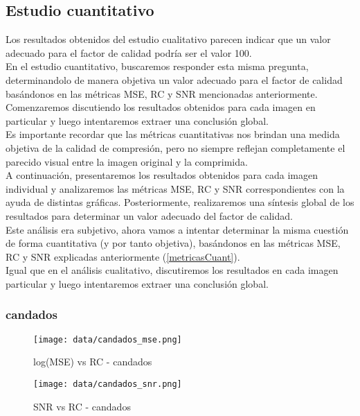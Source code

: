 \documentclass[12pt,a4paper]{article}
\begin{document}
\newpage
\subsection{Estudio cuantitativo}
Los resultados obtenidos del estudio cualitativo parecen indicar que un valor adecuado para el factor de calidad podría ser el valor 100.\\

En el estudio cuantitativo, buscaremos responder esta misma pregunta, determinandolo de manera objetiva un valor adecuado para el factor de calidad basándonos en las métricas MSE, RC y SNR mencionadas anteriormente. Comenzaremos discutiendo los resultados obtenidos para cada imagen en particular y luego intentaremos extraer una conclusión global.\\

Es importante recordar que las métricas cuantitativas nos brindan una medida objetiva de la calidad de compresión, pero no siempre reflejan completamente el parecido visual entre la imagen original y la comprimida.\\ 

A continuación, presentaremos los resultados obtenidos para cada imagen individual y analizaremos las métricas MSE, RC y SNR correspondientes con la ayuda de distintas gráficas. Posteriormente, realizaremos una síntesis global de los resultados para determinar un valor adecuado del factor de calidad.\\

Este análisis era subjetivo, ahora vamos a intentar determinar la misma cuestión de forma cuantitativa (y por tanto objetiva), basándonos en las métricas MSE, RC y SNR explicadas anteriormente (\ref{metricasCuant}). \\

Igual que en el análisis cualitativo, discutiremos los resultados en cada imagen particular y luego intentaremos extraer una conclusión global.\\

\subsubsection{candados}
\begin{minipage}{0.45\textwidth}
        \centering
        \begin{figure}[H]
        \centering
        \texttt{[image: data/candados\_mse.png]}
        \caption{log(MSE) vs RC - candados}
        \end{figure}
        \end{minipage}\hfill
        \begin{minipage}{0.45\textwidth}
         \begin{figure}[H]
        \centering
        \texttt{[image: data/candados\_snr.png]}
        \caption{SNR vs RC - candados}
        
        \end{figure}   
\end{minipage}
    
\end{document}
